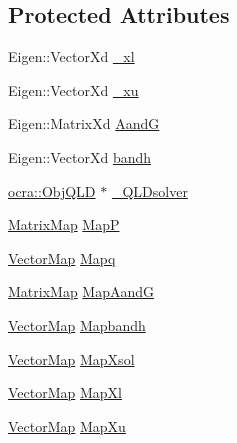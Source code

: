 \subsection*{Protected Attributes}
\begin{DoxyCompactItemize}
\item 
Eigen\+::\+Vector\+Xd \hyperlink{classocra_1_1OneLevelSolverWithQLD_add5b646798e6e18dd3baa6153e42ed3a}{\+\_\+xl}
\item 
Eigen\+::\+Vector\+Xd \hyperlink{classocra_1_1OneLevelSolverWithQLD_af2f22245e4805d0206f70171503501b5}{\+\_\+xu}
\item 
Eigen\+::\+Matrix\+Xd \hyperlink{classocra_1_1OneLevelSolverWithQLD_aabe1df1e34e0e44246736da42822c51c}{AandG}
\item 
Eigen\+::\+Vector\+Xd \hyperlink{classocra_1_1OneLevelSolverWithQLD_a5f85407cde010aa3c41dbc80f3dd254e}{bandh}
\item 
\hyperlink{classocra_1_1ObjQLD}{ocra\+::\+Obj\+Q\+LD} $\ast$ \hyperlink{classocra_1_1OneLevelSolverWithQLD_aa7fbbc63b0e6654166aedee4c067af26}{\+\_\+\+Q\+L\+Dsolver}
\item 
\hyperlink{group__solver_ga2890a4739c18700eeea0645d1e41b5f7}{Matrix\+Map} \hyperlink{classocra_1_1OneLevelSolverWithQLD_abf57e1d9653bf9c6a0c69ba9049fdfaa}{MapP}
\item 
\hyperlink{group__solver_ga48f83fdb8879c800a49682c6f9c3f2e5}{Vector\+Map} \hyperlink{classocra_1_1OneLevelSolverWithQLD_a46b6cd8f4d8cd28cf60ba99231ab182d}{Mapq}
\item 
\hyperlink{group__solver_ga2890a4739c18700eeea0645d1e41b5f7}{Matrix\+Map} \hyperlink{classocra_1_1OneLevelSolverWithQLD_a67c9e0cc8efc507c4e5f0cf216cf5073}{Map\+AandG}
\item 
\hyperlink{group__solver_ga48f83fdb8879c800a49682c6f9c3f2e5}{Vector\+Map} \hyperlink{classocra_1_1OneLevelSolverWithQLD_aedba3797f1f7d4e36a4d5ecf147472a0}{Mapbandh}
\item 
\hyperlink{group__solver_ga48f83fdb8879c800a49682c6f9c3f2e5}{Vector\+Map} \hyperlink{classocra_1_1OneLevelSolverWithQLD_a98bcee40691dd4f96240148c11170fa0}{Map\+Xsol}
\item 
\hyperlink{group__solver_ga48f83fdb8879c800a49682c6f9c3f2e5}{Vector\+Map} \hyperlink{classocra_1_1OneLevelSolverWithQLD_aad35b068cc43424c11d03acc3fa50efb}{Map\+Xl}
\item 
\hyperlink{group__solver_ga48f83fdb8879c800a49682c6f9c3f2e5}{Vector\+Map} \hyperlink{classocra_1_1OneLevelSolverWithQLD_ae775b8d75c6c825a0f689aafc6316b3b}{Map\+Xu}
\end{DoxyCompactItemize}
